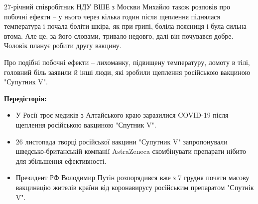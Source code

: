 27-річний співробітник НДУ ВШЕ з Москви Михайло також розповів про побочні
ефекти – у нього через кілька годин після щеплення піднялася температура і
почала боліти шкіра, як при грипі, боліла поясниця і була сильна втома. Але це,
за його словами, тривало недовго, далі він почувався добре. Чоловік планує
робити другу вакцину.

Про подібні побочні ефекти – лихоманку, підвищену температуру, ломоту в тілі,
головний біль заявили й інші люди, які зробили щеплення російською вакциною
"Супутник V".

\textbf{Передісторія: }

\begin{itemize}
\item У Росії троє медиків з Алтайського краю заразилися COVID-19 після щеплення російською вакциною "Спутник V".

\item 26 листопада творці російської вакцини "Супутник V" запропонували
				шведсько-британській компанії AstraZeneca скомбінувати препарати нібито
				для збільшення ефективності.

\item Президент РФ Володимир Путін розпорядився вже з 7 грудня почати масову
				вакцинацію жителів країни від коронавирусу російським препаратом
				"Спутнік V".
\end{itemize}
